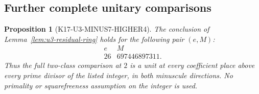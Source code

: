 \documentclass[11pt,a4paper]{article}
\newtheorem{proposition}[theorem]{Proposition}
\theoremstyle{definition}
\begin{document}
\subsection{Further complete unitary comparisons}
\label{sec:u3-minus7-higher4}

\begin{proposition}[K17-U3-MINUS7-HIGHER4]
\label{prop:u3-minus7-higher4}
The conclusion of Lemma~\ref{lem:u3-residual-ring} holds for
the following pair $(e,M)$:
\[
 \begin{array}{c|l}
 e&M\\ \hline
 26&697446897311.
 \end{array}
 \tag{U4.1}
\]
Thus the full two-class comparison at $2$ is a unit at every
coefficient place above every prime divisor of the listed integer,
in both minuscule directions. No primality or squarefreeness
assumption on the integer is used.
\end{proposition}
\end{document}

